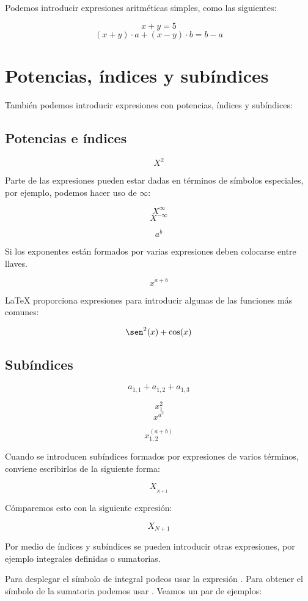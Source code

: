 \documentclass[letterpaper,12pt]{article}
\begin{document}
Podemos introducir expresiones aritméticas simples, como las siguientes:

\[ x + y = 5 \]
\[ (x + y)\cdot a + (x-y)\cdot b = b - a \]

\section{Potencias, índices y subíndices}

También podemos introducir expresiones con potencias, índices y subíndices:

\subsection{Potencias e índices} 

$$ X^2 $$

Parte de las expresiones pueden estar dadas en términos de símbolos especiales, por ejemplo, podemos hacer
uso de $\infty$:

$$ X^\infty $$
$$ X^{-\infty} $$

$$ a^b $$

Si los exponentes están formados por varias expresiones deben colocarse entre llaves.

$$ x^{a + b} $$

\LaTeX{} proporciona expresiones para introducir algunas de las funciones más comunes:

$$ \sen^2(x) + \cos(x) $$

\subsection{Subíndices} 

$$ a_{1,1} + a_{1,2} + a_{1,3} $$

$$ x_1^2 $$ %
$$x^{a^2}$$

$$ x_{1,2}^{(a + b)} $$

Cuando se introducen subíndices formados por expresiones de varios términos, conviene escribirlos 
de la siguiente forma:

$$ X_{_{N+1}} $$

Cómparemos esto con la siguiente expresión:

$$ X_{N+1} $$

Por medio de índices y subíndices se pueden introducir otras expresiones, por ejemplo integrales definidas
o sumatorias. 

Para desplegar el símbolo de integral podeos usar la expresión \verb@\int@. Para obtener el símbolo de la
sumatoria podemos usar \verb@\sum@. Veamos un par de ejemplos:
\end{document}
